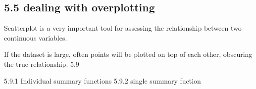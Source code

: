 \subsection*{5.5 dealing with overplotting}
Scatterplot is a very important tool for assessing the relationship between two continuous variables.

If the dataset is large, often points will be plotted on top of each other, obscuring the true relationship.
5.9

5.9.1 Individual summary functions
5.9.2 single summary fuction
